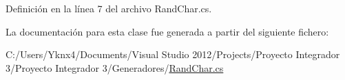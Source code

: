 Definición en la línea 7 del archivo Rand\-Char.\-cs.



La documentación para esta clase fue generada a partir del siguiente fichero\-:\begin{DoxyCompactItemize}
\item 
C\-:/\-Users/\-Yknx4/\-Documents/\-Visual Studio 2012/\-Projects/\-Proyecto Integrador 3/\-Proyecto Integrador 3/\-Generadores/\hyperlink{_rand_char_8cs}{Rand\-Char.\-cs}\end{DoxyCompactItemize}
